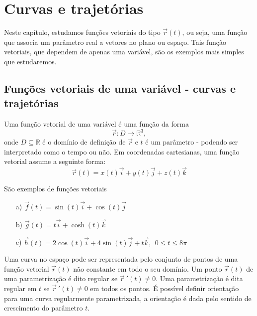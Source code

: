 

\chapter{Curvas e trajetórias}
  Neste capítulo, estudamos funções vetoriais do tipo $\vec{r}(t)$, ou seja, uma função que associa um parâmetro real a vetores no plano ou espaço. Tais função vetoriais, que dependem de apenas uma variável, são os exemplos mais simples que estudaremos. %

\section{Funções vetoriais de uma variável - curvas e trajetórias}
Uma função vetorial de uma variável é uma função da forma $$\vec{r}:D\to \mathbb{R}^3,$$ onde $D\subseteq \mathbb{R}$ é o domínio de definição de $\vec{r}$ e $t$ é um parâmetro - podendo ser interpretado como o tempo ou não. Em coordenadas cartesianas, uma função vetorial assume a seguinte forma:
$$\vec{r}(t)=x(t)\vec{i}+y(t)\vec{j}+z(t)\vec{k}$$
\begin{ex}\label{exfv1} São exemplos de funções vetoriais
\begin{itemize}
\item [a)] $\vec{f}(t)=\sin(t)\vec{i}+\cos(t)\vec{j}$
\item [b)] $\vec{g}(t)=t \vec{i}+\cosh(t)\vec{k}$
\item [c)] $\vec{h}(t)=2\cos(t)\vec{i}+4\sin(t)\vec{j}+t\vec{k},~~ 0\leq t \leq 8\pi$
\end{itemize}
\end{ex}  

Uma curva no espaço pode ser representada pelo conjunto de pontos de uma função vetorial $\vec{r}(t)$ não constante em todo o seu domínio. Um ponto $\vec{r}(t)$ de uma parametrização é dito regular se $\vec{r}\!~'(t)\neq 0$. Uma parametrização é dita regular em $t$ se $\vec{r}~\!'(t)\neq 0$ em todos os pontos. É possível definir orientação para uma curva regularmente parametrizada, a orientação é dada pelo sentido de crescimento do parâmetro $t$. 

